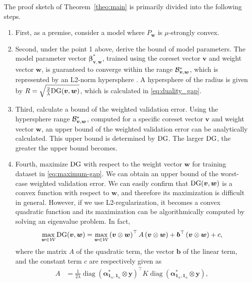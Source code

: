 The proof sketch of Theorem~\ref{theo:main} is primarily divided into the following steps.

\begin{enumerate}
  \item
  First, as a premise, consider a model where $P_{\boldsymbol{w}}$ is $\mu$-strongly convex.
  \item
  Second, under {the point 1 above}, derive the bound of model parameters. The model parameter vector ${\bm \beta}^*_{\bm v, \bm w}$, trained using the coreset vector $\bm v$ and weight vector $\bm w$, is guaranteed to converge within the range ${\cal B}^*_{\bm v, \bm w}$, which is represented by an L2-norm hypersphere \citep{10.1162/neco_a_01619}. 
  A hypersphere of the radius is given by $R = \sqrt{\frac{2}{\lambda}{\rm DG}(\bm v, \bm w)}$, which is calculated in \eqref{eq:duality_gap}.
  \item
  Third, calculate a bound of the weighted validation error.
  Using the hypersphere range ${\cal B}^*_{\bm v, \bm w}$, computed for a specific coreset vector $\bm v$ and weight vector $\bm w$, an upper bound of the weighted validation error can be analytically calculated.
  This upper bound is determined by ${\rm DG}$. The larger ${\rm DG}$, the greater the upper bound becomes.
  \item
  Fourth, maximize ${\rm DG}$ with respect to the weight vector $\bm w$ for training dataset in \eqref{eq:maximum-gap}. We can obtain an upper bound of the worst-case weighted validation error.
		We can easily confirm that ${\rm DG}(\bm v, \bm w)$ is a convex function with respect to $\bm w$,
		and therefore its maximization is difficult in general.
		However, if we use L2-regularization, it becomes a convex quadratic function and its maximization
		can be algorithmically computed by solving an eigenvalue problem. In fact,
		\begin{align}  
		\label{eq:maximum-gap}  
		\max_{\bm w \in {\mathcal W}} {\rm DG}(\bm v, \bm w) =  
		\max_{\bm w \in {\mathcal W}}  
		\left(\boldsymbol{v} \otimes \boldsymbol{w}\right)^{\top} A \left(\boldsymbol{v} \otimes \boldsymbol{w}\right) + \boldsymbol{b}^{\top}\left(\boldsymbol{v} \otimes \boldsymbol{w}\right) + c,  
		\end{align}  
		where the matrix $ A $ of the quadratic term, the vector $ \bm b $ of the linear term, and the constant term $ c $ are respectively given as  
		\begin{align*}  
		A  
		&=  
		\frac{1}{2\lambda} \operatorname{diag}(\bm\alpha_{\bm 1_n, \bm 1_n}^* \otimes \boldsymbol{y})^{\top} K \operatorname{diag}(\bm\alpha_{\bm 1_n, \bm 1_n}^* \otimes \boldsymbol{y}),  

\end{align*}
\end{enumerate}

